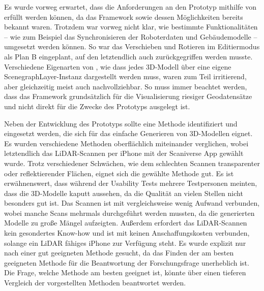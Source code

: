 Es wurde vorweg erwartet, dass die Anforderungen an den Prototyp mithilfe von \deckgl{} erfüllt werden können, da das Framework sowie dessen Möglichkeiten bereits bekannt waren. Trotzdem war vorweg nicht klar, wie bestimmte Funktionalitäten – wie zum Beispiel das Synchronisieren der Roboterdaten und Gebäudemodelle – umgesetzt werden können. So war das Verschieben und Rotieren im Editiermodus als Plan B eingeplant, auf den letztendlich auch zurückgegriffen werden musste. Verschiedene Eigenarten von \deckgl{}, wie dass jedes 3D-Modell über eine eigene ScenegraphLayer-Instanz dargestellt werden muss, waren zum Teil irritierend, aber gleichzeitig meist auch nachvollziehbar. So muss immer beachtet werden, dass das Framework grundsätzlich für die Visualisierung riesiger Geodatensätze und nicht direkt für die Zwecke des Prototyps ausgelegt ist.

Neben der Entwicklung des Prototyps sollte eine Methode identifiziert und eingesetzt werden, die sich für das einfache Generieren von 3D-Modellen eignet. Es wurden verschiedene Methoden oberflächlich miteinander verglichen, wobei letztendlich das \ac{LiDAR}-Scannen per iPhone mit der Scaniverse App gewählt wurde. Trotz verschiedener Schwächen, wie dem schlechten Scannen transparenter oder reflektierender Flächen, eignet sich die gewählte Methode gut. Es ist erwähnenswert, dass während der Usability Tests mehrere Testpersonen meinten, dass die 3D-Modelle kaputt aussehen, da die Qualität an vielen Stellen nicht besonders gut ist. Das Scannen ist mit vergleichsweise wenig Aufwand verbunden, wobei manche Scans mehrmals durchgeführt werden mussten, da die generierten Modelle zu große Mängel aufzeigten. Außerdem erfordert das \ac{LiDAR}-Scannen kein gesondertes Know-how und ist mit keinen Anschaffungskosten verbunden, solange ein \ac{LiDAR} fähiges iPhone zur Verfügung steht. Es wurde explizit nur nach einer gut geeigneten Methode gesucht, da das Finden der am besten geeigneten Methode für die Beantwortung der Forschungsfrage unerheblich ist. Die Frage, welche Methode am besten geeignet ist, könnte über einen tieferen Vergleich der vorgestellten Methoden beantwortet werden.

